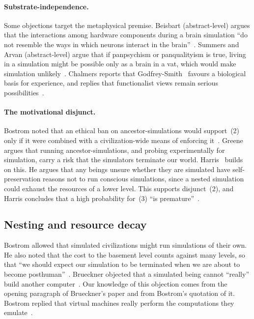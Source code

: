 \paragraph{Substrate-independence.}
Some objections target the metaphysical premise. Beisbart (abstract-level) argues that
the interactions among hardware components during a brain simulation ``do not resemble
the ways in which neurons interact in the brain''~\cite{Beisbart2014are}. Summers and
Arvan (abstract-level) argue that if panpsychism or panqualityism is true, living in a
simulation might be possible only as a brain in a vat, which would make simulation
unlikely~\cite{Summers2022two}. Chalmers reports that Godfrey-Smith~\cite{GodfreySmith2024simulation} favours a
biological basis for experience, and replies that functionalist views remain serious
possibilities~\cite{Chalmers2024taking}.

\paragraph{The motivational disjunct.}
Bostrom noted that an ethical ban on ancestor-simulations would support~(2) only if it
were combined with a civilization-wide means of enforcing it~\cite[\S\,VI]{Bostrom2003are}.
Greene~\cite{Greene2020termination} argues that running ancestor-simulations, and probing
experimentally for simulation, carry a risk that the simulators terminate our world.
Harris~\cite{Harris2024simulation} builds on this. He argues that any beings unsure
whether they are simulated have self-preservation reasons not to run conscious
simulations, since a nested simulation could exhaust the resources of a lower level.
This supports disjunct~(2), and Harris concludes that a high probability for~(3) ``is
premature''~\cite{Harris2024simulation}.

\subsection{Nesting and resource decay}
\label{sec:philosophy:nesting}

Bostrom allowed that simulated civilizations might run simulations of their own. He also
noted that the cost to the basement level counts against many levels, so that ``we
should expect our simulation to be terminated when we are about to become
posthuman''~\cite[\S\,VI]{Bostrom2003are}. Brueckner objected that a simulated being cannot
``really'' build another computer~\cite{Brueckner2008simulation}. Our knowledge of this
objection comes from the opening paragraph of Brueckner's paper and from Bostrom's
quotation of it. Bostrom replied that virtual machines really perform the computations they
emulate~\cite{Bostrom2009simulation}.

